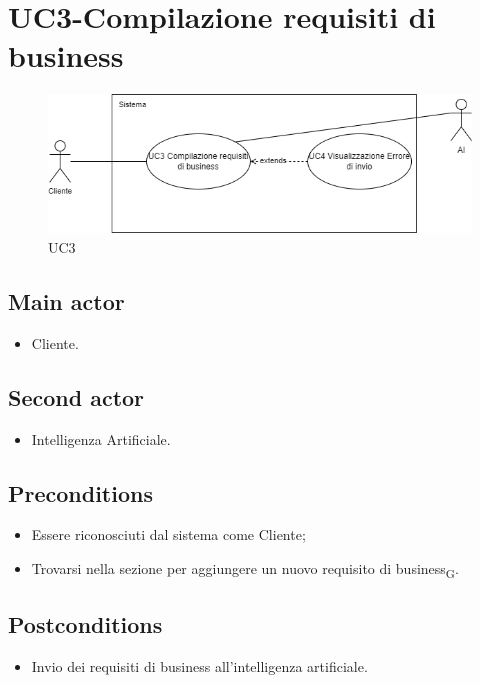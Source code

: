 \documentclass{article}
\begin{document}
    
\section{UC3-Compilazione requisiti di business}
    \begin{figure}[h]
      \centering
      \includegraphics[width=.8\textwidth, height=.6\textheight, keepaspectratio]{./imgUML/UC3.png}
            \caption{UC3}
      \label{fig:UC3}
    \end{figure}
     \subsection*{Main actor}
     \begin{itemize}
         \item Cliente.
     \end{itemize}
      \subsection*{Second actor}
     \begin{itemize}
         \item Intelligenza Artificiale.
     \end{itemize}
     \subsection*{Preconditions} 
     \begin{itemize}
         \item Essere riconosciuti dal sistema come Cliente;
         \item Trovarsi nella sezione per aggiungere un nuovo requisito di business\textsubscript{G}.
     \end{itemize}
     \subsection*{Postconditions} 
        \begin{itemize}
            \item Invio dei requisiti di business all'intelligenza artificiale.
        \end{itemize}
        
\end{document}
